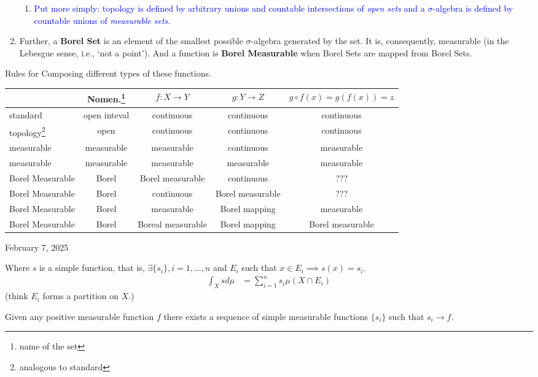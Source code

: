 \documentclass[10pt,a4paper]{report}
\newcommand{\BLUE}[1]{\textcolor{blue}{#1}}
\begin{document}
\begin{enumerate}
\begin{enumerate}
    		\item \BLUE{Put more simply: topology is defined by arbitrary unions and countable intersections of \textit{open sets} and a $\sigma$-algebra is defined by countable unions of \textit{measurable sets}.}
	\end{enumerate}      
    \item  Further, a \textbf{Borel Set} is an element of the smallest possible $\sigma$-algebra generated by the set.  It is, consequently, measurable (in the Lebesgue sense, i.e., ‘not a point’).  And a function is \textbf{Borel Measurable} when Borel Sets are mapped from Borel Sets.

\end{enumerate}

\noindent Rules for Composing different types of these functions.

\begin{tabular}{|l|c|c|c|c|}
\hline 
	& Nomen.\footnote{name of the set} & $f:X \to Y$ & $g:Y \to Z$ & $g\circ f(x) =g(f(x)) = z$ \\
	\hline
	standard & open inteval &continuous & continuous & continuous \\
	\hline
	topology\footnote{analogous to standard} & open &continuous & continuous & continuous \\
	\hline
	measurable & measurable & measurable & continuous & measurable \\
	\hline
	measurable & measurable & measurable & measurable & measurable \\
	\hline 
	Borel Measurable & Borel & Borel measurable  & continuous & ??? \\
	\hline 
	Borel Measurable & Borel & continuous & Borel measurable & ??? \\
	\hline 
	Borel Measurable & Borel & measurable & Borel mapping & measurable \\
	\hline 
	Borel Measurable & Borel & Boreal measurable & Borel mapping & Borel measurable \\
\hline
\end{tabular}

\newpage
\noindent February 7, 2025\\

\begin{definition}

Where $s$ is a simple function, that is, $\exists \{s_i\}, i= 1, \dots, n$ and $E_i$ such that $x \in E_i \implies s(x) = s_i$.
\begin{align*}
	\int_X s d\mu &= \sum_{i=1}^n s_i \mu(X \cap E_i)
\end{align*}(think $E_i$ forms a partition on $X$.)
\end{definition}
\begin{theorem}
Given any positive measurable function $f$ there exists a sequence of simple measurable functions $\{s_i\}$ such that $s_i \to f$.
\end{theorem}
\end{document}
